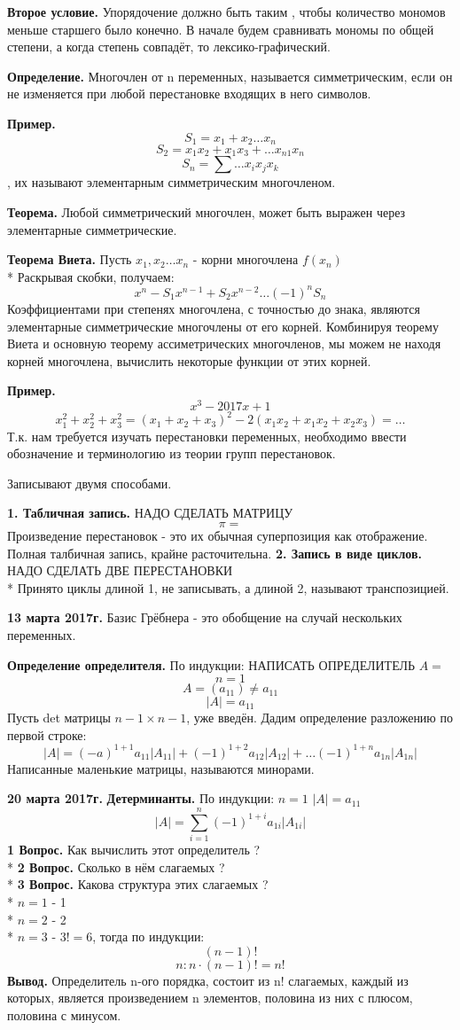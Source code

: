 \documentclass{article}
\begin{document}
{\bf Второе условие.} Упорядочение должно быть таким , чтобы количество мономов меньше старшего было конечно. В начале будем сравнивать мономы по  общей степени, а когда степень совпадёт, то лексико-графический.

{\bf Определение.} Многочлен от n переменных, называется симметрическим, если он не изменяется при любой перестановке входящих в него символов.

{\bf Пример.} $$S_1=x_1+x_2\ldots x_n$$
$$S_2=x_1x_2+x_1x_3+\ldots x_{n1}x_n$$
$$S_n=\sum\ldots x_ix_jx_k$$, их называют элементарным симметрическим многочленом.

{\bf Теорема.} Любой симметрический многочлен, может быть выражен через элементарные симметрические.

{\bf Теорема Виета.} Пусть $x_1,x_2\ldots x_n$ - корни многочлена $f(x_n)$\\*
Раскрывая скобки, получаем: $$x^n-S_1x^{n-1}+S_2x^{n-2}\ldots (-1)^nS_n$$
Коэффициентами при степенях многочлена, с точностью до знака, являются элементарные симметрические многочлены от его корней. Комбинируя теорему Виета и основную теорему ассиметрических многочленов, мы можем не находя корней многочлена, вычислить некоторые функции от этих корней.

{\bf Пример.} $$x^3-2017x+1$$
$$x^2_1+x^2_2+x^2_3=(x_1+x_2+x_3)^2-2(x_1x_2+x_1x_2+x_2x_3)=\ldots$$
Т.к. нам требуется изучать перестановки переменных, необходимо ввести обозначение и терминологию из теории групп перестановок. 

Записывают двумя способами.

{\bf 1. Табличная запись.} НАДО СДЕЛАТЬ МАТРИЦУ $$\pi=$$
Произведение перестановок - это их обычная суперпозиция как отображение. Полная талбичная запись, крайне расточительна.
{\bf 2. Запись в виде циклов.} НАДО СДЕЛАТЬ ДВЕ ПЕРЕСТАНОВКИ\\*
Принято циклы длиной 1, не записывать, а длиной 2, называют транспозицией.

\textbf {13 марта 2017г.}
Базис Грёбнера - это обобщение на случай нескольких переменных.

{\bf Определение определителя.} По индукции: НАПИСАТЬ ОПРЕДЕЛИТЕЛЬ $A=$
$$n=1$$ $$A=(a_{11})\ne a_{11}$$ $$|A|=a_{11}$$
Пусть det матрицы $n-1\times n-1$, уже введён. Дадим определение разложению по первой строке: $$|A|=(-a)^{1+1}a_{11}|A_{11}|+(-1)^{1+2}a_{12}|A_{12}|+\ldots(-1)^{1+n}a_{1n}|A_{1n}|$$
Написанные маленькие матрицы, называются минорами.

\textbf {20 марта 2017г.}
{\bf Детерминанты.} По индукции: $n=1$ $|A|=a_{11}$ 
$$|A|=\sum_{i=1}^n(-1)^{1+i}a_{1i}|A_{1i}|$$
{\bf 1 Вопрос.} Как вычислить этот определитель ?\\*
{\bf 2 Вопрос.} Сколько в нём слагаемых ?\\*
{\bf 3 Вопрос.} Какова структура этих слагаемых ?\\*
$n=1$ - 1\\*
$n=2$ - 2\\*
$n=3$ - $3!=6$, тогда по индукции:
$$(n-1)!$$
$$n: n\cdot(n-1)!=n!$$
{\bf Вывод.} Определитель n-ого порядка, состоит из n! слагаемых, каждый из которых, является произведением n элементов, половина из них с плюсом, половина с минусом.
\end{document}
